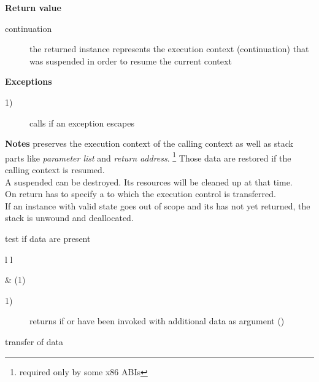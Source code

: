 {\bfseries Return value}
\begin{description}
    \item[continuation] the returned instance represents the execution context
                        (continuation) that was suspended in order to
                        resume the current context
\end{description}

{\bfseries Exceptions}
\begin{description}
    \item[1)] calls  if an exception escapes \entryfn\ 
              \\
\end{description}

{\bfseries Notes}
\newline
\call preserves the execution context of the calling context as well as stack
parts like \emph{parameter list} and \emph{return address}.
\footnote{required only by some x86 ABIs} Those data are restored if the calling
context is resumed.\\
A suspended  can be destroyed. Its resources will be cleaned
up at that time.\\
On return  has to specify a \cont to which the execution control is
transferred.\\
If an instance with valid state goes out of scope and its  has not yet
returned, the stack is unwound and deallocated.



test if data are present\\

\begin{tabular}{ l l }
    \midrule

     & (1)\\

    \midrule
\end{tabular}

\begin{description}
    \item[1)] returns  if \call or \op have been invoked with
              additional data as argument (\cpp{args})
\end{description}



transfer of data\\

